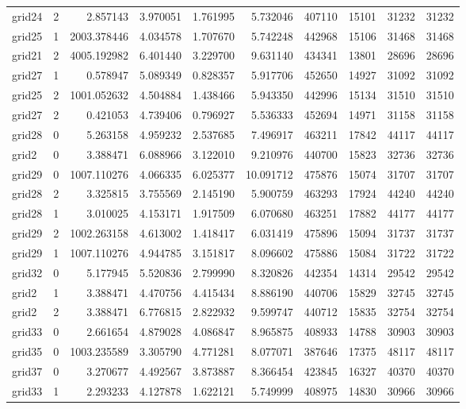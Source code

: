\begin{longtable}{|l|r|r|r|r|r|r|r|r|r|}
grid24 & 2 & 2.857143 & 3.970051 & 1.761995 & 5.732046 & 407110 & 15101 & 31232 & 31232 \\
grid25 & 1 & 2003.378446 & 4.034578 & 1.707670 & 5.742248 & 442968 & 15106 & 31468 & 31468 \\
grid21 & 2 & 4005.192982 & 6.401440 & 3.229700 & 9.631140 & 434341 & 13801 & 28696 & 28696 \\
grid27 & 1 & 0.578947 & 5.089349 & 0.828357 & 5.917706 & 452650 & 14927 & 31092 & 31092 \\
grid25 & 2 & 1001.052632 & 4.504884 & 1.438466 & 5.943350 & 442996 & 15134 & 31510 & 31510 \\
grid27 & 2 & 0.421053 & 4.739406 & 0.796927 & 5.536333 & 452694 & 14971 & 31158 & 31158 \\
grid28 & 0 & 5.263158 & 4.959232 & 2.537685 & 7.496917 & 463211 & 17842 & 44117 & 44117 \\
grid2 & 0 & 3.388471 & 6.088966 & 3.122010 & 9.210976 & 440700 & 15823 & 32736 & 32736 \\
grid29 & 0 & 1007.110276 & 4.066335 & 6.025377 & 10.091712 & 475876 & 15074 & 31707 & 31707 \\
grid28 & 2 & 3.325815 & 3.755569 & 2.145190 & 5.900759 & 463293 & 17924 & 44240 & 44240 \\
grid28 & 1 & 3.010025 & 4.153171 & 1.917509 & 6.070680 & 463251 & 17882 & 44177 & 44177 \\
grid29 & 2 & 1002.263158 & 4.613002 & 1.418417 & 6.031419 & 475896 & 15094 & 31737 & 31737 \\
grid29 & 1 & 1007.110276 & 4.944785 & 3.151817 & 8.096602 & 475886 & 15084 & 31722 & 31722 \\
grid32 & 0 & 5.177945 & 5.520836 & 2.799990 & 8.320826 & 442354 & 14314 & 29542 & 29542 \\
grid2 & 1 & 3.388471 & 4.470756 & 4.415434 & 8.886190 & 440706 & 15829 & 32745 & 32745 \\
grid2 & 2 & 3.388471 & 6.776815 & 2.822932 & 9.599747 & 440712 & 15835 & 32754 & 32754 \\
grid33 & 0 & 2.661654 & 4.879028 & 4.086847 & 8.965875 & 408933 & 14788 & 30903 & 30903 \\
grid35 & 0 & 1003.235589 & 3.305790 & 4.771281 & 8.077071 & 387646 & 17375 & 48117 & 48117 \\
grid37 & 0 & 3.270677 & 4.492567 & 3.873887 & 8.366454 & 423845 & 16327 & 40370 & 40370 \\
grid33 & 1 & 2.293233 & 4.127878 & 1.622121 & 5.749999 & 408975 & 14830 & 30966 & 30966 \\

\end{longtable}
